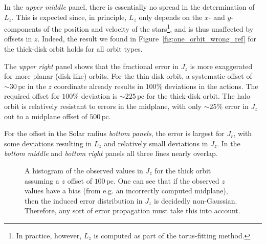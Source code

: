 \documentclass[twocolumn]{aastex62}
\newcommand{\pc}{\text{pc}}
\newcommand{\uth}{\textsuperscript{th}}
\begin{document}
In the {\em upper middle} panel, there is essentially no spread in the
determination of $L_z$. This is expected since, in principle, $L_z$ only
depends on the $x$- and $y$-components of the position and velocity of the
stars\footnote{In practice, however, $L_z$ is computed as part of the torus-fitting method.}, and is
thus unaffected by offsets in $z$. Indeed, the result we found
in Figure~\ref{fig:one_orbit_wrong_ref} for the thick-disk orbit holds for all orbit types.
 
The {\em upper right} panel shows that the fractional error in $J_z$ is more
exaggerated for more planar (disk-like) orbits. For the thin-disk orbit, a systematic offset of
$\sim30\,\pc$ in the $z$ coordinate already results in $100\%$ deviations in the actions. The required
offset for $100\%$ deviation is $\sim225\,\pc$ for the thick-disk orbit. The halo
orbit is relatively resistant to errors in the midplane, with only $\sim25\%$
error in $J_z$ out to a midplane offset of $500\,\pc$.

For the offset in the Solar radius {\em bottom panels}, the error is largest
for $J_r$, with some deviations resulting in $L_z$ and relatively small
deviations in $J_z$. In the {\em bottom middle} and {\em bottom right} panels
all three lines nearly overlap.

\begin{figure*}
\caption{We report the 95\uth minus 5\uth percentile of the error in the
measured action ($\Delta J_i$) from coordinate system errors for the thin,
thick, and halo orbits (Table~\ref{tab:orbits}). The {\em left}, {\em center},
and {\em right} panels show the result for $J_r$, $L_z$, and $J_z$,
respectively. The {\em upper} panels consider an offset in $z$ and the {\em
lower} panels consider an offset in $x$ (equivalently, an offset in the Solar
radius).}
\label{fig:many_orbit_wrong_ref}
\end{figure*}

\begin{figure}
\caption{A histogram of the observed values in $J_z$ for the thick orbit
assuming a $z$ offset of $100\,\pc$. One can see that if the observed $z$
values have a bias (from e.g. an incorrectly computed midplane), then the
induced error distribution in $J_z$ is decidedly non-Gaussian. Therefore, any
sort of error propagation must take this into account.}
\label{fig:Jz_hist}
\end{figure}

\end{document}
